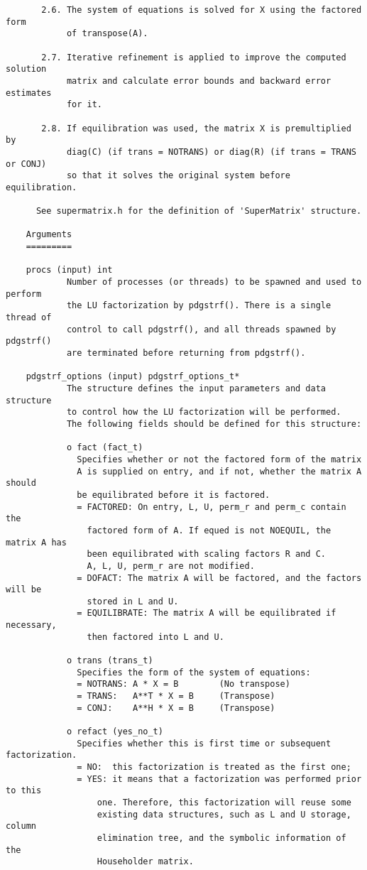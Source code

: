 \begin{verbatim}
       2.6. The system of equations is solved for X using the factored form
            of transpose(A).

       2.7. Iterative refinement is applied to improve the computed solution
            matrix and calculate error bounds and backward error estimates
            for it.

       2.8. If equilibration was used, the matrix X is premultiplied by
            diag(C) (if trans = NOTRANS) or diag(R) (if trans = TRANS or CONJ)
            so that it solves the original system before equilibration.

      See supermatrix.h for the definition of 'SuperMatrix' structure.

    Arguments
    =========
 
    procs (input) int
            Number of processes (or threads) to be spawned and used to perform
            the LU factorization by pdgstrf(). There is a single thread of
            control to call pdgstrf(), and all threads spawned by pdgstrf() 
            are terminated before returning from pdgstrf().

    pdgstrf_options (input) pdgstrf_options_t*
            The structure defines the input parameters and data structure
            to control how the LU factorization will be performed.
            The following fields should be defined for this structure:

            o fact (fact_t)
              Specifies whether or not the factored form of the matrix
              A is supplied on entry, and if not, whether the matrix A should
              be equilibrated before it is factored.
              = FACTORED: On entry, L, U, perm_r and perm_c contain the 
                factored form of A. If equed is not NOEQUIL, the matrix A has
                been equilibrated with scaling factors R and C.
                A, L, U, perm_r are not modified.
              = DOFACT: The matrix A will be factored, and the factors will be
                stored in L and U.
              = EQUILIBRATE: The matrix A will be equilibrated if necessary,
                then factored into L and U.

            o trans (trans_t)
              Specifies the form of the system of equations:
              = NOTRANS: A * X = B        (No transpose)
              = TRANS:   A**T * X = B     (Transpose)
              = CONJ:    A**H * X = B     (Transpose)

            o refact (yes_no_t)
              Specifies whether this is first time or subsequent factorization.
              = NO:  this factorization is treated as the first one;
              = YES: it means that a factorization was performed prior to this
                  one. Therefore, this factorization will reuse some
                  existing data structures, such as L and U storage, column
                  elimination tree, and the symbolic information of the
                  Householder matrix.


\end{verbatim}
